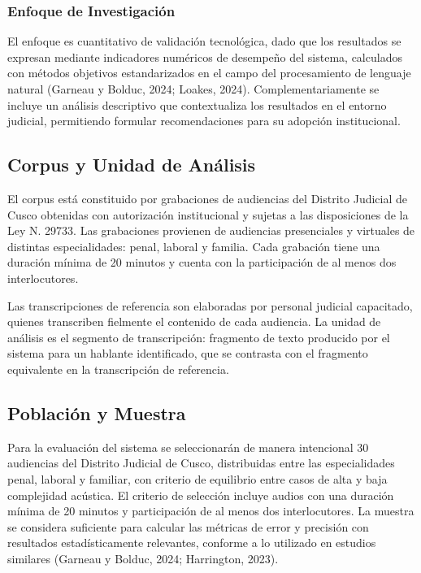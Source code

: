 \documentclass[12pt,a4paper,oneside]{article}
\begin{document}
\subsubsection{Enfoque de Investigaci\'on}

El enfoque es cuantitativo de validaci\'on tecnol\'ogica, dado que los resultados se expresan mediante indicadores num\'ericos de desempe\~no del sistema, calculados con m\'etodos objetivos estandarizados en el campo del procesamiento de lenguaje natural (Garneau y Bolduc, 2024; Loakes, 2024). Complementariamente se incluye un an\'alisis descriptivo que contextualiza los resultados en el entorno judicial, permitiendo formular recomendaciones para su adopci\'on institucional.

\subsection{Corpus y Unidad de An\'alisis}

El corpus est\'a constituido por grabaciones de audiencias del Distrito Judicial de Cusco obtenidas con autorizaci\'on institucional y sujetas a las disposiciones de la Ley N.\textordmasculine{} 29733. Las grabaciones provienen de audiencias presenciales y virtuales de distintas especialidades: penal, laboral y familia. Cada grabaci\'on tiene una duraci\'on m\'inima de 20 minutos y cuenta con la participaci\'on de al menos dos interlocutores.

Las transcripciones de referencia son elaboradas por personal judicial capacitado, quienes transcriben fielmente el contenido de cada audiencia. La unidad de an\'alisis es el segmento de transcripci\'on: fragmento de texto producido por el sistema para un hablante identificado, que se contrasta con el fragmento equivalente en la transcripci\'on de referencia.

\subsection{Poblaci\'on y Muestra}

Para la evaluaci\'on del sistema se seleccionar\'an de manera intencional 30 audiencias del Distrito Judicial de Cusco, distribuidas entre las especialidades penal, laboral y familiar, con criterio de equilibrio entre casos de alta y baja complejidad ac\'ustica. El criterio de selecci\'on incluye audios con una duraci\'on m\'inima de 20 minutos y participaci\'on de al menos dos interlocutores. La muestra se considera suficiente para calcular las m\'etricas de error y precisi\'on con resultados estad\'isticamente relevantes, conforme a lo utilizado en estudios similares (Garneau y Bolduc, 2024; Harrington, 2023).
\end{document}
